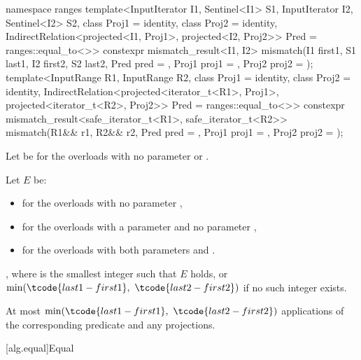 \begin{itemdecl}
namespace ranges {
  template<InputIterator I1, Sentinel<I1> S1, InputIterator I2, Sentinel<I2> S2,
           class Proj1 = identity, class Proj2 = identity,
           IndirectRelation<projected<I1, Proj1>,
                            projected<I2, Proj2>> Pred = ranges::equal_to<>>
    constexpr mismatch_result<I1, I2>
      mismatch(I1 first1, S1 last1, I2 first2, S2 last2, Pred pred = {},
               Proj1 proj1 = {}, Proj2 proj2 = {});
  template<InputRange R1, InputRange R2,
           class Proj1 = identity, class Proj2 = identity,
           IndirectRelation<projected<iterator_t<R1>, Proj1>,
                            projected<iterator_t<R2>, Proj2>> Pred = ranges::equal_to<>>
    constexpr mismatch_result<safe_iterator_t<R1>, safe_iterator_t<R2>>
      mismatch(R1&& r1, R2&& r2, Pred pred = {},
               Proj1 proj1 = {}, Proj2 proj2 = {});
}
\end{itemdecl}

\begin{itemdescr}
\pnum
Let  be 
for the overloads with no parameter  or .

\pnum
Let $E$ be:
\begin{itemize}
\setlength{\emergencystretch}{1em}
\item
  for the overloads with no parameter ,
\item
  for the overloads with a parameter  and
  no parameter ,
\item
  for the overloads with both parameters  and .
\end{itemize}

\pnum
\returns
{},
where  is the smallest integer such that $E$ holds,
or $\min(\tcode{last1 - first1}, \ \tcode{last2 - first2})$
if no such integer exists.

\pnum
\complexity
At most $\min(\tcode{last1 - first1}, \ \tcode{last2 - first2})$
applications of the corresponding predicate and any projections.
\end{itemdescr}

[alg.equal]{Equal}

